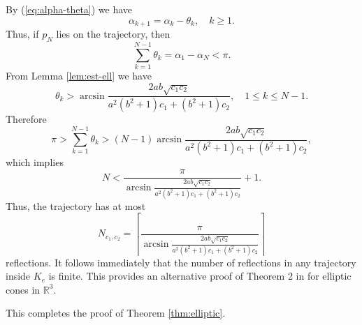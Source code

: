 \documentclass[12pt]{article}
\begin{document}
By (\ref{eq:alpha-theta}) we have
$$
\alpha_{k+1} = \alpha_{k} - \theta_k, 
\quad  k \geq 1.
$$ 
Thus, if $p_N$ lies on the trajectory, then
$$
\sum_{k=1}^{N-1}  \theta_k = \alpha_{1} - \alpha_{N} < \pi.
$$
From Lemma \ref{lem:est-ell} we have
$$
\theta_k 
> 
\arcsin 
\frac{2ab\sqrt{c_1 c_2}}
{a^2(b^2 + 1)c_1 + (b^2 + 1)c_2},
\quad 1\leq k \leq N-1.
$$
Therefore
$$
\pi > \sum_{k=1}^{N-1} \theta_k 
> 
(N-1) 
\arcsin 
\frac{2ab\sqrt{c_1 c_2}}
{a^2(b^2 + 1)c_1 + (b^2 + 1)c_2},
$$
which implies 
$$
N < \frac{\pi}{\arcsin \frac{2ab\sqrt{c_1 c_2}}{a^2(b^2 + 1)c_1 + (b^2 + 1)c_2}} + 1.
$$
Thus, the trajectory has at most 
$$
N_{c_1, c_2} = \left\lceil \frac{\pi }{\arcsin \frac{2ab\sqrt{c_1 c_2}}{ a^2(b^2 + 1)c_1 + (b^2 + 1)c_2}} \right\rceil 
$$
reflections.
It follows immediately that the number of reflections in any trajectory inside $K_e$ is finite. 
This provides an alternative proof of Theorem 2 in \cite{MY} for elliptic cones in $\mathbb{R}^3$.

This completes the proof of Theorem \ref{thm:elliptic}.
\end{document}
